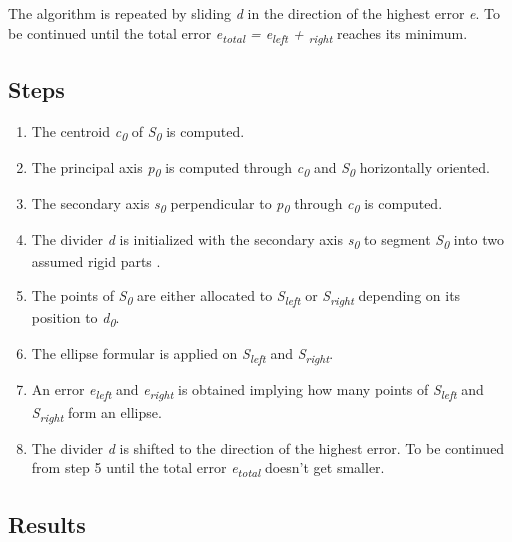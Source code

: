 The algorithm is repeated by sliding \textit{d} in the direction of the highest error \textit{e}. To be continued until the total error \textit{e\textsubscript{total} = e\textsubscript{left} + \textsubscript{right}} reaches its minimum.

\subsection{Steps}

\begin{enumerate}
	\item The centroid \textit{c\textsubscript{0}}  of \textit{S\textsubscript{0}} is computed.
	
	\item The principal axis \textit{p\textsubscript{0}} is computed through \textit{c\textsubscript{0}} and \textit{S\textsubscript{0}} horizontally oriented. 
	
	\item The secondary axis \textit{s\textsubscript{0}}  perpendicular to \textit{p\textsubscript{0}} through \textit{c\textsubscript{0}} is computed.
	
	\item The divider \textit{d} is initialized with the secondary axis \textit{s\textsubscript{0}} to segment \textit{S\textsubscript{0}} into two assumed rigid parts .
	
	\item The points of \textit{S\textsubscript{0}} are either allocated to \textit{S\textsubscript{left}} or \textit{S\textsubscript{right}} depending on its position to \textit{d\textsubscript{0}}.
	
	\item The ellipse formular is applied on \textit{S\textsubscript{left}} and \textit{S\textsubscript{right}}.
	
	\item An error \textit{e\textsubscript{left}} and \textit{e\textsubscript{right}} is obtained implying how many points of \textit{S\textsubscript{left}} and \textit{S\textsubscript{right}} form an ellipse. 
	
	\item The divider \textit{d} is shifted to the direction of the highest error. To be continued from step 5 until the total error \textit{e\textsubscript{total}} doesn't get smaller. 
\end{enumerate}

\subsection{Results}

